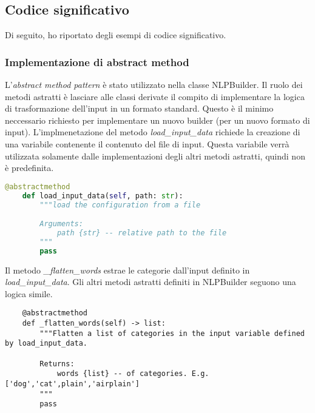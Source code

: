 \subsection{Codice significativo}

Di seguito, ho riportato degli esempi di codice significativo.
\subsubsection*{Implementazione di abstract method}
L'\textit{abstract method pattern} è stato utilizzato nella classe NLPBuilder. Il ruolo dei metodi astratti è lasciare alle classi derivate il compito di implementare la logica di trasformazione dell'input in un formato standard. Questo è il minimo neccessario richiesto per implementare un nuovo builder (per un nuovo formato di input).
\newline\newline
L'implmenetazione del metodo \textit{load\_input\_data} richiede la creazione di una variabile contenente il contenuto del file di input. Questa variabile verrà utilizzata solamente dalle implementazioni degli altri metodi astratti, quindi non è predefinita.
\begin{lstlisting}[language=python]
    @abstractmethod
    def load_input_data(self, path: str):
        """load the configuration from a file

        Arguments:
            path {str} -- relative path to the file
        """
        pass
\end{lstlisting}
Il metodo \textit{\_flatten\_words} estrae le categorie dall'input definito in \textit{load\_input\_data}. Gli altri metodi astratti definiti in NLPBuilder seguono una logica simile.
\begin{lstlisting}
    @abstractmethod
    def _flatten_words(self) -> list:
        """Flatten a list of categories in the input variable defined by load_input_data.

        Returns:
            words {list} -- of categories. E.g. ['dog','cat',plain','airplain']
        """
        pass
\end{lstlisting}